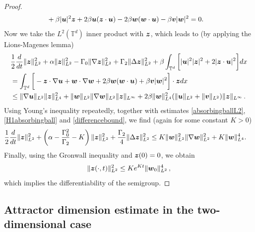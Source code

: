 \documentclass[11pt]{amsart}
\newcommand{\bu}{\mbox{\boldmath$u$}}
\newcommand{\bv}{\mbox{\boldmath$v$}}
\newcommand{\bw}{\mbox{\boldmath$w$}}
\newcommand{\bz}{\mbox{\boldmath$z$}}
\newcommand{\Rb}{\beta}
\newcommand{\Gamzero}{\Gamma_{0}}
\newcommand{\Gamtwo}{\Gamma_{2}}
\theoremstyle{definition}
\numberwithin{equation}{section}
\numberwithin{equation}{section}
\begin{document}
\begin{proof}
\begin{align*}
&+ \Rb \lvert \bu \rvert^2 \bz + 2 \Rb \bu (\bz \cdot \bu) - 2 \Rb \bw (\bw \cdot \bu) - \Rb \bv \lvert \bw \rvert^2 = 0.
\end{align*}
Now we take the $L^2 (\mathbb{T}^d)$ inner product with $\bz$, which leads to (by applying the Lions-Magenes lemma)
\begin{align*}
&\frac{1}{2} \frac{d}{d t} \lVert \bz \rVert_{L^2}^2 + \alpha \lVert \bz \rVert_{L^2}^2 - \Gamzero \lVert \nabla \bz \rVert_{L^2}^2 + \Gamtwo \lVert \Delta \bz \rVert_{L^2}^2 + \Rb \int_{\mathbb{T}^d} \bigg[ \lvert \bu \rvert^2 \lvert \bz \rvert^2 + 2 \lvert \bz \cdot \bu \rvert^2 \bigg] dx \\
&= \int_{\mathbb{T}^d} \bigg[- \bz \cdot \nabla \bu + \bw \cdot \nabla \bw + 2 \Rb \bw (\bw \cdot \bu) + \Rb \bv \lvert \bw \rvert^2  \bigg] \cdot \bz dx \\
&\leq \lVert \nabla \bu \rVert_{L^2} \lVert \bz \rVert_{L^4}^2 + \lVert \bw \rVert_{L^2} \lVert \nabla \bw \rVert_{L^2} \lVert \bz \rVert_{L^\infty} + 2 \Rb \lVert \bw \rVert_{L^4}^2 (\lVert \bu \rVert_{L^2} + \lVert \bv \rVert_{L^2}) \lVert \bz \rVert_{L^\infty} \,.
\end{align*}
Using Young's inequality repeatedly, together with estimates \eqref{absorbingballL2}, \eqref{H1absorbingball} and \eqref{differencebound}, we find (again for some constant $K > 0$)
\begin{align*}
&\frac{1}{2} \frac{d}{d t} \lVert \bz \rVert_{L^2}^2 + \left(\alpha - \frac{\Gamzero^2}{\Gamtwo} - K \right) \lVert \bz \rVert_{L^2}^2 + \frac{\Gamtwo}{4} \lVert \Delta \bz \rVert_{L^2}^2 \leq K \lVert \bw \rVert_{L^2}^2 \lVert \nabla \bw \rVert_{L^2}^2 + K \lVert \bw \rVert_{L^4}^4.
\end{align*}
Finally, using the Gronwall inequality and $\bz (0) = 0$, we obtain 
\begin{equation}
\lVert \bz (\cdot, t) \rVert_{L^2}^2 \leq K e^{K t} \lVert \bw_0 \rVert_{L^2}^4\,,
\end{equation}
which implies the differentiability of the semigroup.
\end{proof}

\subsection{Attractor dimension estimate in the two-dimensional case}\label{2datt}
\end{document}
